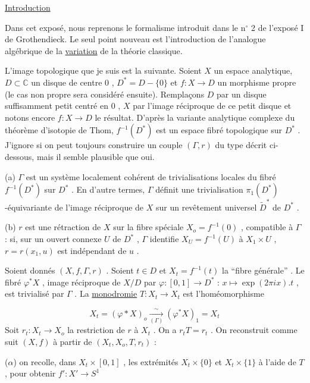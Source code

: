 


\underline{Introduction}

Dans cet exposé, nous reprenons le formalisme introduit dans le n$^\circ$ 2 de l'exposé I de Grothendieck. Le seul point nouveau est l'introduction de l'analogue algébrique de la \underline{variation} de la théorie classique.

L'image topologique que je suis est la suivante. Soient $X$ un espace analytique, $D \subset \mathbb{C}$ un disque de centre $0$ , $D^* = D - \{0\}$ et $f : X \to D$ un morphisme propre (le cas non propre sera considéré ensuite). Remplaçons $D$ par un disque suffisamment petit centré en $0$ , $X$ par l'image réciproque de ce petit disque et notons encore $f : X \to D$ le résultat. D'après la variante analytique complexe du théorème d'isotopie de Thom, $f^{-1}(D^*)$ est un espace fibré topologique sur $D^*$ . J'ignore si on peut toujours construire un couple $(\Gamma, r)$ du type décrit ci-dessous, mais il semble plausible que oui.

(a) $\Gamma$ est un système localement cohérent de trivialisations locales du fibré $f^{-1}(D^*)$ sur $D^*$ . En d'autre termes, $\Gamma$ définit une trivialisation $\pi_1(D^*)$-équivariante de l'image réciproque de $X$ sur un revêtement universel $\widetilde{D}^*$ de $D^*$ .

(b) $r$ est une rétraction de $X$ sur la fibre spéciale $X_o = f^{-1}(0)$ , compatible à $\Gamma$ : si, sur un ouvert connexe $U$ de $D^*$ , $\Gamma$ identifie $X_U = f^{-1}(U)$ à $X_1 \times U$ , $r = r(x_1, u)$ est indépendant de $u$ .

Soient donnés $(X, f, \Gamma , r)$ . Soient $t \in D$ et $X_t = f^{-1}(t)$ la ``fibre générale'' . Le fibré $\varphi^* X$ , image réciproque de $X/D$ par $\varphi : [0, 1] \to D^*$ : $x \longmapsto \exp(2 \pi i x).t$ , est trivialisé par $\Gamma$ . La \underline{monodromie} $T : X_t \longrightarrow X_t$ est l'homéomorphisme

\begin{equation*}
X_t = (\varphi * X)_o \xrightarrow[(\Gamma)]{\sim} (\varphi^* X)_1 = X_t
\end{equation*}
Soit $r_t : X_t \longrightarrow X_o$ la restriction de $r$ à $X_t$ . On a $r_t T = r_t$ . On reconstruit comme suit $(X, f)$ à partir de $(X_t, X_o, T, r_t)$ :

($\alpha$) on recolle, dans $X_t \times [0, 1]$ , les extrémités $X_t \times \{0\}$ et $X_t \times \{1\}$ à l'aide de $T$ , pour obtenir $f' : X' \longrightarrow S^1$

